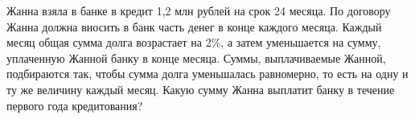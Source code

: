 \begin{ex}
	\begin{condition}
		Жанна взяла в банке в кредит 1,2 млн рублей на срок 24 месяца. По договору Жанна должна вносить в банк часть денег в конце каждого месяца. Каждый месяц общая сумма долга возрастает на 2\%, а затем уменьшается на сумму, уплаченную Жанной банку в конце месяца. Суммы, выплачиваемые Жанной, подбираются так, чтобы сумма долга уменьшалась равномерно, то есть на одну и ту же величину каждый месяц. Какую сумму Жанна выплатит банку в течение первого года кредитования?
	\end{condition}
\end{ex}